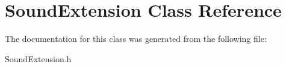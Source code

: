 \hypertarget{class_sound_extension}{}\section{Sound\+Extension Class Reference}
\label{class_sound_extension}


The documentation for this class was generated from the following file\+:\begin{DoxyCompactItemize}
\item 
Sound\+Extension.\+h\end{DoxyCompactItemize}
